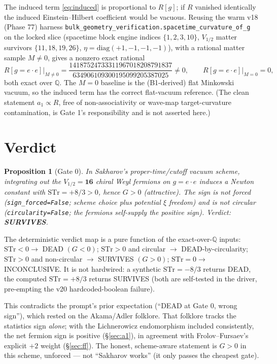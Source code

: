 \documentclass[11pt]{article}
\newtheorem{proposition}{Proposition}
\newcommand{\STr}{\mathrm{STr}}
\newcommand{\QQ}{\mathbb{Q}}
\begin{document}
The induced term \eqref{eq:induced} is proportional to $R[g]$; if $R$ vanished
identically the induced Einstein--Hilbert coefficient would be vacuous. Reusing the warm
v18 (Phase 77) harness \texttt{bulk\_geometry\_verification.spacetime\_curvature\_of\_g}
on the locked slice (spacetime block engine indices $\{1,2,3,10\}$, $V_{1/2}$ matter
survivors $\{11,18,19,26\}$, $\eta=\mathrm{diag}(+1,-1,-1,-1)$), with a rational matter
sample $M\neq0$, gives a nonzero exact rational
\begin{equation}\label{eq:Ranchor}
R[g=e\!\cdot\!e]\Big|_{M\neq0}
=\frac{14187524733311967018208791837}{634906109300195099205387025}\neq0,
\qquad
R[g=e\!\cdot\!e]\Big|_{M=0}=0,
\end{equation}
both exact over $\QQ$. The $M=0$ baseline is the (B1-derived) flat Minkowski vacuum, so
the induced term has the correct flat-vacuum reference. (The clean statement
$a_1\propto R$, free of non-associativity or wave-map target-curvature contamination,
is Gate 1's responsibility and is not asserted here.)

\section{Verdict}\label{sec:verdict}

\begin{proposition}[Gate 0]\label{prop:gate0}
In Sakharov's proper-time/cutoff vacuum scheme, integrating out the $V_{1/2}=\mathbf{16}$
chiral Weyl fermions on $g=e\!\cdot\!e$ induces a Newton constant with
$\STr=+8/3>0$, hence $G>0$ (attractive). The sign is not forced
(\texttt{sign\_forced=False}; scheme choice plus potential $\xi$ freedom) and is not
circular (\texttt{circularity=False}; the fermions self-supply the positive sign).
Verdict: \textbf{SURVIVES}.
\end{proposition}

The deterministic verdict map is a pure function of the exact-over-$\QQ$ inputs:
$\STr<0\to$ DEAD $(G<0)$; $\STr>0$ and circular $\to$ DEAD-by-circularity; $\STr>0$ and
non-circular $\to$ SURVIVES $(G>0)$; $\STr=0\to$ INCONCLUSIVE. It is not hardwired: a
synthetic $\STr=-8/3$ returns DEAD, the computed $\STr=+8/3$ returns SURVIVES (both are
self-tested in the driver, pre-empting the v20 hardcoded-boolean failure).

This contradicts the prompt's prior expectation (``DEAD at Gate 0, wrong sign''), which
rested on the Akama/Adler folklore. That folklore tracks the statistics sign
\emph{alone}; with the Lichnerowicz endomorphism included consistently, the net fermion
sign is positive (\S\ref{sec:a1}), in agreement with Frolov--Fursaev's explicit $+2$
weight (\S\ref{sec:ff}). The honest, scheme-aware statement is $G>0$ in this scheme,
unforced --- not ``Sakharov works'' (it only passes the cheapest gate).
\end{document}
